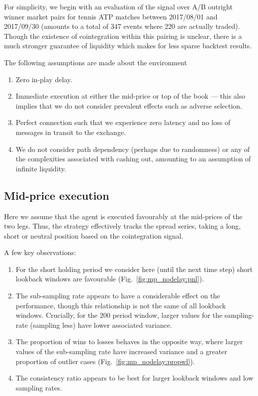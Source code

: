 For simplicity, we begin with an evaluation of the signal over A/B outright
winner market pairs for tennis ATP matches between 2017/08/01 and 2017/09/30
(amounts to a total of 347 events where 220 are actually traded). Though the
existence of cointegration within this pairing is unclear, there is a much
stronger guarantee of liquidity which makes for less sparse backtest results.

The following assumptions are made about the environment
\begin{enumerate}
    \item Zero in-play delay.
    \item Immediate execution at either the mid-price or top of the book ---
        this also implies that we do not consider prevalent effects such as
        adverse selection.
    \item Perfect connection such that we experience zero latency and no loss of
        messages in transit to the exchange.
    \item We do not consider path dependency (perhaps due to randomness) or any
        of the complexities associated with cashing out, amounting to an
        assumption of infinite liquidity.
\end{enumerate}

\subsection{Mid-price execution}
Here we assume that the agent is executed favourably at the mid-prices of the
two legs. Thus, the strategy effectively tracks the spread series, taking a
long, short or neutral position based on the cointegration signal.

A few key observations:
\begin{enumerate}
    \item For the short holding period we consider here (until the next time
        step) short lookback windows are favourable
        (Fig.~\ref{fig:mp_nodelay:pnl}).
    \item The sub-sampling rate appears to have a considerable effect on the
        performance, though this relationship is not the same of all lookback
        windows. Crucially, for the 200 period window, larger values for the
        sampling-rate (sampling less) have lower associated variance.
    \item The proportion of wins to losses behaves in the opposite way, where
        larger values of the sub-sampling rate have increased variance and a
        greater proportion of outlier cases (Fig.~\ref{fig:mp_nodelay:propwl}).
    \item The consistency ratio appears to be best for larger lookback windows
        and low sampling rates.
\end{enumerate}

